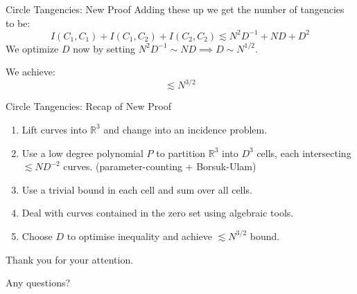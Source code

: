 \documentclass{beamer}
\newcommand{\RR}{\mathbb R}
\newcommand{\nfr}[1]{\begin{frame} #1
\end{frame}}
\begin{document}
\nfr{{Circle Tangencies: New Proof }
Adding these up we get the number of tangencies to be:
\[
    I(C_1,C_1) +I(C_1,C_2) + I(C_2,C_2) \lesssim N^2 D^{-1} + ND + D^2  
\]
\pause
We optimize $D$ now by setting $N^2 D^{-1} \sim ND \implies D \sim N^{1/2}$.

We achieve:
\[
    \lesssim  N^{3/2} 
\]
}

\nfr{{Circle Tangencies: Recap of New Proof}

\begin{enumerate}
    \item Lift curves into $\RR^3$ and change into an incidence problem.
    \item Use a low degree polynomial $P$ to partition $\RR^3$ into $D^3$ cells, each intersecting $\lesssim ND^{-2}$ curves. (parameter-counting + Borsuk-Ulam)
    \item Use a trivial bound in each cell and sum over all cells.
    \item Deal with curves contained in the zero set using algebraic tools. 
    \item Choose $D$ to optimise inequality and achieve $\lesssim N^{3/2}$ bound.
\end{enumerate}
}
\nfr{{}
\begin{center}
Thank you for your attention.

Any questions? 

\end{center}
}




\end{document}
